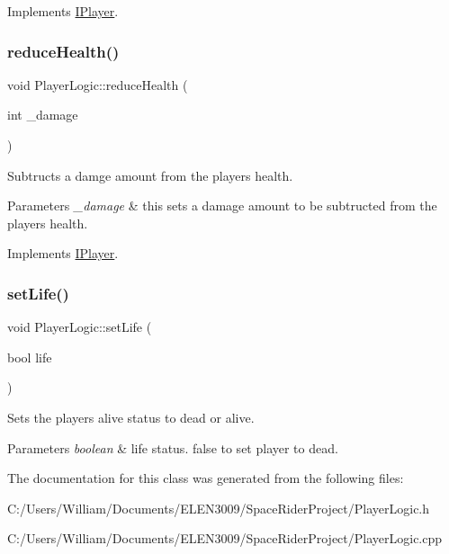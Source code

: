 Implements \hyperlink{class_i_player}{I\+Player}.

\mbox{\label{class_player_logic_a43c4cfcdfd439ff3ef8015c2170f9381}} 
\subsubsection{\texorpdfstring{reduce\+Health()}{reduceHealth()}}
{\footnotesize\ttfamily void Player\+Logic\+::reduce\+Health (\begin{DoxyParamCaption}\item[{int}]{\+\_\+damage }\end{DoxyParamCaption})\hspace{0.3cm}{\ttfamily [virtual]}}



Subtructs a damge amount from the players health. 


\begin{DoxyParams}{Parameters}
{\em \+\_\+damage} & this sets a damage amount to be subtructed from the players health. \\
\hline
\end{DoxyParams}


Implements \hyperlink{class_i_player}{I\+Player}.

\mbox{\label{class_player_logic_a3139e107a0eb76e7307f8657818b3007}} 
\subsubsection{\texorpdfstring{set\+Life()}{setLife()}}
{\footnotesize\ttfamily void Player\+Logic\+::set\+Life (\begin{DoxyParamCaption}\item[{bool}]{life }\end{DoxyParamCaption})}



Sets the players alive status to dead or alive. 


\begin{DoxyParams}{Parameters}
{\em boolean} & life status. false to set player to dead. \\
\hline
\end{DoxyParams}


The documentation for this class was generated from the following files\+:\begin{DoxyCompactItemize}
\item 
C\+:/\+Users/\+William/\+Documents/\+E\+L\+E\+N3009/\+Space\+Rider\+Project/Player\+Logic.\+h\item 
C\+:/\+Users/\+William/\+Documents/\+E\+L\+E\+N3009/\+Space\+Rider\+Project/Player\+Logic.\+cpp\end{DoxyCompactItemize}
